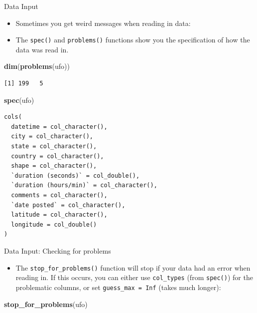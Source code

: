 \documentclass[
  ignorenonframetext,
]{beamer}
\newenvironment{Shaded}{\begin{snugshade}}{\end{snugshade}}
\newcommand{\KeywordTok}[1]{\textcolor[rgb]{0.13,0.29,0.53}{\textbf{#1}}}
\newcommand{\NormalTok}[1]{#1}
\providecommand{\tightlist}{%
  \setlength{\itemsep}{0pt}\setlength{\parskip}{0pt}}
\begin{document}
\begin{frame}[fragile]{Data Input}
\protect\hypertarget{data-input-12}{}

\begin{itemize}
\tightlist
\item
  Sometimes you get weird messages when reading in data:
\item
  The \texttt{spec()} and \texttt{problems()} functions show you the
  specification of how the data was read in.
\end{itemize}

\begin{Shaded}
\begin{Highlighting}[]
\KeywordTok{dim}\NormalTok{(}\KeywordTok{problems}\NormalTok{(ufo))}
\end{Highlighting}
\end{Shaded}

\begin{verbatim}
[1] 199   5
\end{verbatim}

\begin{Shaded}
\begin{Highlighting}[]
\KeywordTok{spec}\NormalTok{(ufo)}
\end{Highlighting}
\end{Shaded}

\begin{verbatim}
cols(
  datetime = col_character(),
  city = col_character(),
  state = col_character(),
  country = col_character(),
  shape = col_character(),
  `duration (seconds)` = col_double(),
  `duration (hours/min)` = col_character(),
  comments = col_character(),
  `date posted` = col_character(),
  latitude = col_character(),
  longitude = col_double()
)
\end{verbatim}

\end{frame}

\begin{frame}[fragile]{Data Input: Checking for problems}
\protect\hypertarget{data-input-checking-for-problems}{}

\begin{itemize}
\tightlist
\item
  The \texttt{stop\_for\_problems()} function will stop if your data had
  an error when reading in. If this occurs, you can either use
  \texttt{col\_types} (from \texttt{spec()}) for the problematic
  columns, or set \texttt{guess\_max\ =\ Inf} (takes much longer):
\end{itemize}

\begin{Shaded}
\begin{Highlighting}[]
\KeywordTok{stop_for_problems}\NormalTok{(ufo)}
\end{Highlighting}
\end{Shaded}

\end{frame}
\end{document}
